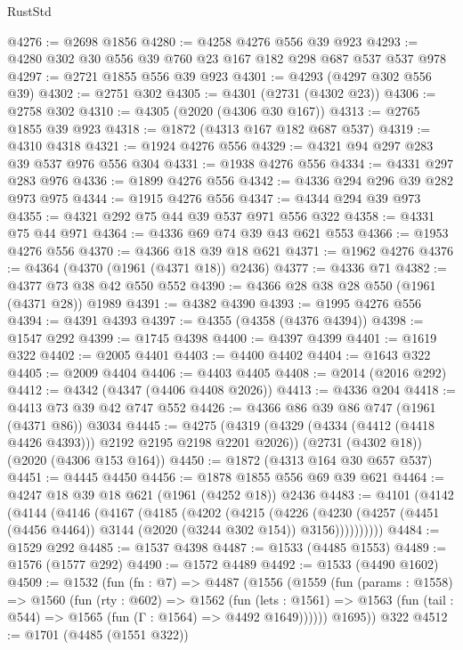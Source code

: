 \begin{lexlean}{RustStd}
\begin{coremodule}
@4276 := @2698 @1856
@4280 := @4258 @4276 @556 @39 @923
@4293 := @4280 @302 @30 @556 @39 @760 @23 @167 @182 @298 @687 @537 @537 @978
@4297 := @2721 @1855 @556 @39 @923
@4301 := @4293 (@4297 @302 @556 @39)
@4302 := @2751 @302
@4305 := @4301 (@2731 (@4302 @23))
@4306 := @2758 @302
@4310 := @4305 (@2020 (@4306 @30 @167))
@4313 := @2765 @1855 @39 @923
@4318 := @1872 (@4313 @167 @182 @687 @537)
@4319 := @4310 @4318
@4321 := @1924 @4276 @556
@4329 := @4321 @94 @297 @283 @39 @537 @976 @556 @304
@4331 := @1938 @4276 @556
@4334 := @4331 @297 @283 @976
@4336 := @1899 @4276 @556
@4342 := @4336 @294 @296 @39 @282 @973 @975
@4344 := @1915 @4276 @556
@4347 := @4344 @294 @39 @973
@4355 := @4321 @292 @75 @44 @39 @537 @971 @556 @322
@4358 := @4331 @75 @44 @971
@4364 := @4336 @69 @74 @39 @43 @621 @553
@4366 := @1953 @4276 @556
@4370 := @4366 @18 @39 @18 @621
@4371 := @1962 @4276
@4376 := @4364 (@4370 (@1961 (@4371 @18)) @2436)
@4377 := @4336 @71
@4382 := @4377 @73 @38 @42 @550 @552
@4390 := @4366 @28 @38 @28 @550 (@1961 (@4371 @28)) @1989
@4391 := @4382 @4390
@4393 := @1995 @4276 @556
@4394 := @4391 @4393
@4397 := @4355 (@4358 (@4376 @4394))
@4398 := @1547 @292
@4399 := @1745 @4398
@4400 := @4397 @4399
@4401 := @1619 @322
@4402 := @2005 @4401
@4403 := @4400 @4402
@4404 := @1643 @322
@4405 := @2009 @4404
@4406 := @4403 @4405
@4408 := @2014 (@2016 @292)
@4412 := @4342 (@4347 (@4406 @4408 @2026))
@4413 := @4336 @204
@4418 := @4413 @73 @39 @42 @747 @552
@4426 := @4366 @86 @39 @86 @747 (@1961 (@4371 @86)) @3034
@4445 := @4275
    (@4319 (@4329 (@4334 (@4412 (@4418 @4426 @4393))) @2192 @2195 @2198 @2201 @2026))
    (@2731 (@4302 @18))
    (@2020 (@4306 @153 @164))
@4450 := @1872 (@4313 @164 @30 @657 @537)
@4451 := @4445 @4450
@4456 := @1878 @1855 @556 @69 @39 @621
@4464 := @4247 @18 @39 @18 @621 (@1961 (@4252 @18)) @2436
@4483 := @4101
    (@4142
      (@4144
        (@4146
          (@4167
            (@4185
              (@4202
                (@4215
                  (@4226
                    (@4230
                      (@4257 (@4451 (@4456 @4464)) @3144 (@2020 (@3244 @302 @154)) @3156))))))))))
@4484 := @1529 @292
@4485 := @1537 @4398
@4487 := @1533 (@4485 @1553)
@4489 := @1576 (@1577 @292)
@4490 := @1572 @4489
@4492 := @1533 (@4490 @1602)
@4509 := @1532
    (fun (fn : @7) =>
    @4487
      (@1556
        (@1559
          (fun (params : @1558) =>
          @1560
            (fun (rty : @602) =>
            @1562
              (fun (lets : @1561) =>
              @1563 (fun (tail : @544) => @1565 (fun (Γ : @1564) => @4492 @1649))))))
        @1695))
    @322
@4512 := @1701 (@4485 (@1551 @322))

\end{coremodule}
\end{lexlean}
